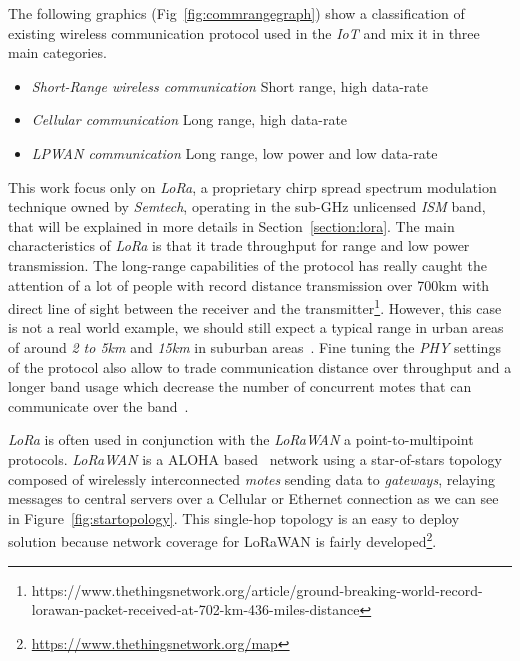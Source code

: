 The following graphics (Fig~\ref{fig:commrangegraph}) show a classification of
existing wireless communication protocol used in the \emph{IoT} and mix it in three 
main categories.

\begin{itemize}
    \item \emph{Short-Range wireless communication} Short range, high data-rate
    \item \emph{Cellular communication} Long range, high data-rate
    \item \emph{LPWAN communication} Long range, low power and low data-rate
\end{itemize}



This work focus only on \emph{LoRa}, a proprietary chirp spread spectrum
modulation technique owned by \emph{Semtech}, operating in the sub-GHz
unlicensed \emph{ISM} band, that will be explained in more details in 
Section~\ref{section:lora}.
The main characteristics of \emph{LoRa} is that it trade throughput for range
and low power transmission. 
The long-range capabilities of the protocol has really caught the attention of
a lot of people with record distance transmission over 700km
with direct line of sight between the receiver and the
transmitter\footnote{https://www.thethingsnetwork.org/article/ground-breaking-world-record-lorawan-packet-received-at-702-km-436-miles-distance}.
However, this case is not a real world example, we should still expect a typical 
range in urban areas of around \emph{2 to 5km} and \emph{15km} in suburban
areas~\cite{8030482}. Fine tuning the \emph{PHY} settings of the protocol also
allow to trade communication distance over throughput and a longer band usage
which decrease the number of concurrent motes that can communicate over the
band~\cite{10.1145/2988287.2989163}.

\emph{LoRa} is often used in conjunction with the \emph{LoRaWAN} a 
point-to-multipoint protocols.
\emph{LoRaWAN} is a ALOHA based~\cite{loraalliance:lorawanspecification} network
using a star-of-stars topology composed of wirelessly interconnected 
\emph{motes} sending data to \emph{gateways}, relaying messages to central 
servers over a Cellular or Ethernet connection as we can see in 
Figure~\ref{fig:startopology}.
This single-hop topology is an easy to deploy solution because network coverage
for LoRaWAN is fairly
developed\footnote{\url{https://www.thethingsnetwork.org/map}}.


